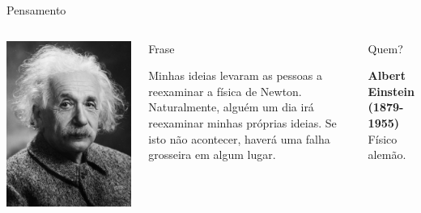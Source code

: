 \documentclass[xcolor=dvipsnames,table]{beamer}
\begin{document}
	\begin{frame}{Pensamento}
		\begin{columns}
		  		\begin{center}
		    		\includegraphics[height=.6\textheight]{images/einstein.jpg}
		  		\end{center}
				\begin{block}{Frase}
					\begin{center}
						{\large Minhas ideias levaram as pessoas a reexaminar a física de Newton. Naturalmente, alguém um dia irá reexaminar minhas próprias ideias. Se isto não acontecer, haverá uma falha grosseira em algum lugar.}
					\end{center}
				\end{block}		  		
		  		\begin{block}{Quem?}
		  			\begin{center}
						{\bf Albert Einstein (1879-1955)} \\ Físico alemão.
					\end{center}
				\end{block}
		\end{columns}
	\end{frame}
\end{document}
